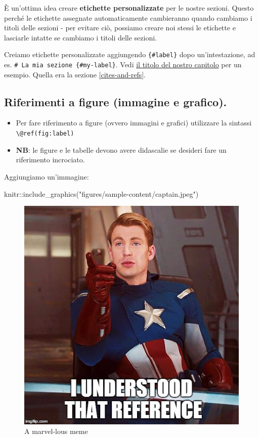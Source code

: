 \documentclass[a4paper, 11pt, nobind]{templates/ociamthesis}
\providecommand{\tightlist}{%
  \setlength{\itemsep}{0pt}\setlength{\parskip}{0pt}}
\newenvironment{Shaded}{\begin{snugshade}}{\end{snugshade}}
\newcommand{\FunctionTok}[1]{\textcolor[rgb]{0.00,0.00,0.00}{#1}}
\newcommand{\NormalTok}[1]{#1}
\newcommand{\SpecialCharTok}[1]{\textcolor[rgb]{0.00,0.00,0.00}{#1}}
\newcommand{\StringTok}[1]{\textcolor[rgb]{0.31,0.60,0.02}{#1}}
\renewenvironment{Shaded}
{
  \vspace{10pt}%
  \begin{snugshade}%
}{%
  \end{snugshade}%
  \vspace{8pt}%
}
\begin{document}
È un'ottima idea creare \textbf{etichette personalizzate} per le nostre sezioni. Questo perché le etichette assegnate automaticamente cambieranno quando cambiamo i titoli delle sezioni - per evitare ciò, possiamo creare noi stessi le etichette e lasciarle intatte se cambiamo i titoli delle sezioni.

Creiamo etichette personalizzate aggiungendo \texttt{\{\#label\}} dopo un'intestazione, ad es. \texttt{\#\ La\ mia\ sezione\ \{\#my-label\}}.
Vedi \protect\hyperlink{cites-and-refs}{il titolo del nostro capitolo} per un esempio. Quella era la sezione \ref{cites-and-refs}.

\hypertarget{riferimenti-a-figure-immagine-e-grafico.}{%
\subsection{Riferimenti a figure (immagine e grafico).}\label{riferimenti-a-figure-immagine-e-grafico.}}

\begin{itemize}
\tightlist
\item
  Per fare riferimento a figure (ovvero immagini e grafici) utilizzare la sintassi \texttt{\textbackslash{}@ref(fig:label)}
\item
  \textbf{NB}: le figure e le tabelle devono avere didascalie se desideri fare un riferimento incrociato.
\end{itemize}

Aggiungiamo un'immagine:

\begin{Shaded}
\begin{Highlighting}[]
\NormalTok{knitr}\SpecialCharTok{::}\FunctionTok{include\_graphics}\NormalTok{(}\StringTok{"figures/sample{-}content/captain.jpeg"}\NormalTok{)}
\end{Highlighting}
\end{Shaded}

\begin{figure}

{\centering \includegraphics[width=0.65\linewidth]{figures/sample-content/captain} 

}

\caption{A marvel-lous meme}\label{fig:captain}
\end{figure}
\end{document}
